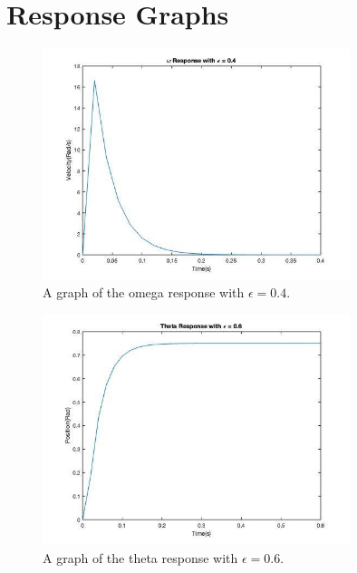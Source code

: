 

\section{Response Graphs}

\begin{figure}[H]
	\centering
	\includegraphics[width=0.8\textwidth]{./figures/lab6_omegaresponse_e_04.jpg}
	\caption{A graph of the omega response with $\epsilon = 0.4$.}
	\label{fig:}
\end{figure}

\begin{figure}[H]
	\centering
	\includegraphics[width=0.8\textwidth]{./figures/lab6_thetaresponse_e_06.jpg}
	\caption{A graph of the theta response with $\epsilon = 0.6$.}
	\label{fig:}
\end{figure}

